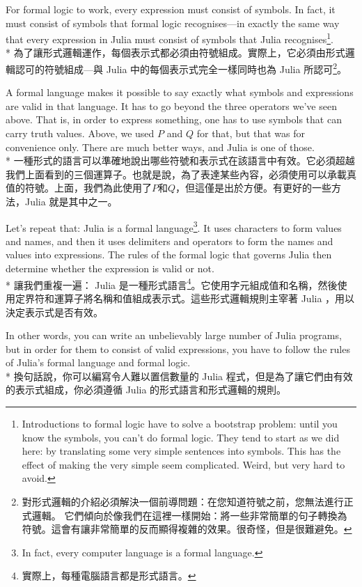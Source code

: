 \documentclass[]{article}
\begin{document}
{\color{gray}For formal logic to work, every expression must consist of symbols. In fact, it must consist of symbols that formal logic recognises---in exactly the same way that every expression in Julia must consist of symbols that Julia recognises\footnote{{\color{gray}Introductions to formal logic have to solve a bootstrap problem: until you know the symbols, you can't do formal logic. They tend to start as we did here: by translating some very simple sentences into symbols. This has the effect of making the very simple seem complicated. Weird, but very hard to avoid.}}.}
\\*
{為了讓形式邏輯運作，每個表示式都必須由符號組成。實際上，它必須由形式邏輯認可的符號組成---與 Julia 中的每個表示式完全一樣同時也為 Julia 所認可\footnote{對形式邏輯的介紹必須解決一個前導問題：在您知道符號之前，您無法進行正式邏輯。 它們傾向於像我們在這裡一樣開始：將一些非常簡單的句子轉換為符號。這會有讓非常簡單的反而顯得複雜的效果。很奇怪，但是很難避免。}。}

{\color{gray}A formal language makes it possible to say exactly what symbols and expressions are valid in that language. It has to go beyond the three operators we've seen above. That is, in order to express something, one has to use symbols that can carry truth values. Above, we used $ P $ and $ Q $ for that, but that was for convenience only. There are much better ways, and Julia is one of those.
}
\\*
{一種形式的語言可以準確地說出哪些符號和表示式在該語言中有效。它必須超越我們上面看到的三個運算子。也就是說，為了表達某些內容，必須使用可以承載真值的符號。上面，我們為此使用了$ P $和$ Q $，但這僅是出於方便。有更好的一些方法，Julia 就是其中之一。
}

{\color{gray}Let's repeat that: Julia is a formal language\footnote{{\color{gray}In fact, every computer language is a formal language.}}. It uses characters to form values and names, and then it uses delimiters and operators to form the names and values into expressions. The rules of the formal logic that governs Julia then determine whether the expression is valid or not.}
\\*
{讓我們重複一遍： Julia 是一種形式語言\footnote{實際上，每種電腦語言都是形式語言。}。它使用字元組成值和名稱，然後使用定界符和運算子將名稱和值組成表示式。這些形式邏輯規則主宰著 Julia ，用以決定表示式是否有效。}

{\color{gray}In other words, you can write an unbelievably large number of Julia programs, but in order for them to consist of valid expressions, you have to follow the rules of Julia's formal language and formal logic.}
\\*
{換句話說，你可以編寫令人難以置信數量的 Julia 程式，但是為了讓它們由有效的表示式組成，你必須遵循 Julia 的形式語言和形式邏輯的規則。}
\end{document}
